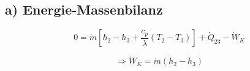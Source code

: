 \subsection*{a) Energie-Massenbilanz}

\[
0 = \dot{m} \left[ h_2 - h_3 + \frac{c_p}{\lambda} (T_2 - T_3) \right] + \dot{Q}_{23} - \dot{W}_K
\]

\[
\Rightarrow \dot{W}_K = \dot{m} (h_2 - h_3)
\]